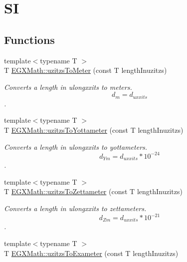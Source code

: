 \hypertarget{group___e_g_x_math-_conversions-_length_conversions-uzitzs-_s_i}{}\section{SI}
\label{group___e_g_x_math-_conversions-_length_conversions-uzitzs-_s_i}
\subsection*{Functions}
\begin{DoxyCompactItemize}
\item 
{\footnotesize template$<$typename T $>$ }\\T \mbox{\hyperlink{group___e_g_x_math-_conversions-_length_conversions-uzitzs-_s_i_gad256d80aa1424b503ded3fda023ee4dd}{E\+G\+X\+Math\+::uzitzs\+To\+Meter}} (const T length\+Inuzitzs)
\begin{DoxyCompactList}\small\item\em Converts a length in ulongxxits to meters. \[ d_{m}=d_{uxxits} \]. \end{DoxyCompactList}\item 
{\footnotesize template$<$typename T $>$ }\\T \mbox{\hyperlink{group___e_g_x_math-_conversions-_length_conversions-uzitzs-_s_i_gac20be4db1eed0397d7925d5b7148dd94}{E\+G\+X\+Math\+::uzitzs\+To\+Yottameter}} (const T length\+Inuzitzs)
\begin{DoxyCompactList}\small\item\em Converts a length in ulongxxits to yottameters. \[ d_{Ym}=d_{uxxits} * 10^{-24} \]. \end{DoxyCompactList}\item 
{\footnotesize template$<$typename T $>$ }\\T \mbox{\hyperlink{group___e_g_x_math-_conversions-_length_conversions-uzitzs-_s_i_ga43f793911855da08c6649eb9b059d9c2}{E\+G\+X\+Math\+::uzitzs\+To\+Zettameter}} (const T length\+Inuzitzs)
\begin{DoxyCompactList}\small\item\em Converts a length in ulongxxits to zettameters. \[ d_{Zm}=d_{uxxits} * 10^{-21} \]. \end{DoxyCompactList}\item 
{\footnotesize template$<$typename T $>$ }\\T \mbox{\hyperlink{group___e_g_x_math-_conversions-_length_conversions-uzitzs-_s_i_ga4c102f14f5804c46db22137411ceb3be}{E\+G\+X\+Math\+::uzitzs\+To\+Exameter}} (const T length\+Inuzitzs)

\end{DoxyCompactItemize}
